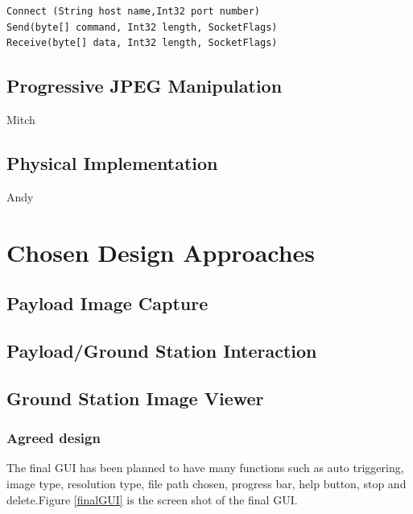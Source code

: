 \documentclass[oneside]{ecsgdp}         %
\begin{document}
\begin{lstlisting}[caption=Socket class connect receive and send method,label=socketClasscrs]
Connect (String host name,Int32 port number)
Send(byte[] command, Int32 length, SocketFlags)
Receive(byte[] data, Int32 length, SocketFlags)
\end{lstlisting}
\section{Progressive JPEG Manipulation}
Mitch

\section{Physical Implementation}
Andy


\chapter{Chosen Design Approaches}


\section{Payload Image Capture}

\section{Payload/Ground Station Interaction}

\section{Ground Station Image Viewer}
\subsection{Agreed design}

The final GUI has been planned to have many functions such as auto triggering, image type, resolution type, file path chosen, progress bar, help button, stop and delete.Figure \ref{finalGUI} is the screen shot of the final GUI.
\end{document}
